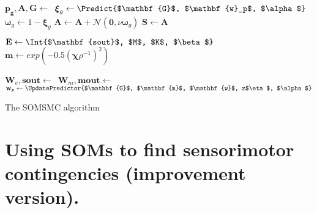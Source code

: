 \documentclass[a4paper]{article}
\begin{document}
\begin{algorithm}[H]
{{    	\BlankLine
		
    	$\mathbf{p_g}, \mathbf{A},\mathbf{G}\leftarrow$\,\;  
        $\boldsymbol{\xi}_{g}\leftarrow\Predict{$\mathbf{G}$, $\mathbf{w}_p$, $\alpha$}$\;
        $\boldsymbol{\omega}_{g}\leftarrow 1 - \boldsymbol{\xi}_{g}$\;
        $\mathbf{A}\leftarrow\mathbf{A} + \mathcal{N}(\mathbf{0}, \nu\boldsymbol{\omega}_{g})$\; 
        $\mathbf{S}\leftarrow\mathbf{A}$\;

    	\BlankLine
	
        $\mathbf{E}\leftarrow\Int{$\mathbf{sout}$, $M$, $K$, $\beta$}$\;
		$\mathbf{m} \leftarrow exp(-0.5(\boldsymbol{\chi}\rho^{-1})^2)$\;
        
        \BlankLine
        
        $\mathbf{W}_e,\mathbf{sout}\leftarrow$\,\;
        $\mathbf{W}_m,\mathbf{mout}\leftarrow$\,\;
        $\mathbf{w}_p\leftarrow\UpdatePredictor{$\mathbf{G}$, $\mathbf{m}$, $\mathbf{w}$, z$\eta$, $\alpha$}$\;

    	\BlankLine
	
    }
}

\caption{The SOMSMC algorithm}\label{smc1}
\end{algorithm}
\DecMargin{1em}

\pagebreak
\section*{Using SOMs to find sensorimotor contingencies (improvement version).}
\end{document}
